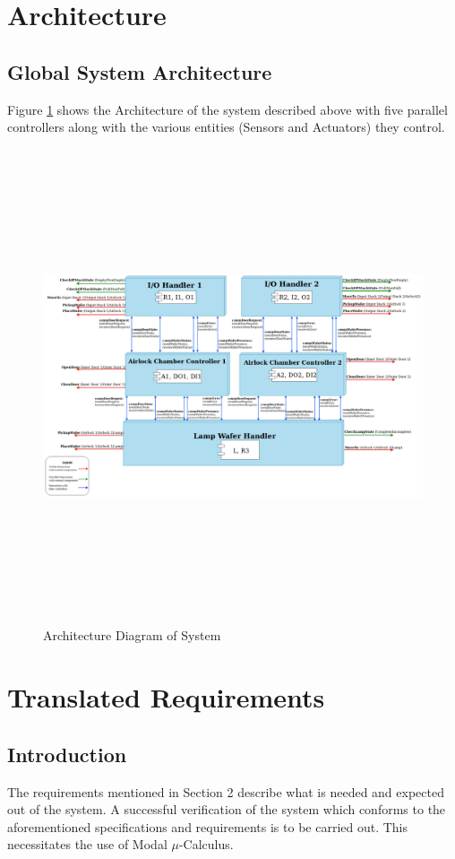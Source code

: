 \documentclass[a4paper,12pt]{article}
\begin{document}
	\section{Architecture}
	\subsection{Global System Architecture}
	Figure \ref{fig:arch1} shows the Architecture of the system described above with five parallel controllers along with the various entities (Sensors and Actuators) they control.\\
	
	\begin{figure}[ht]
		\centerline{
			\includegraphics[width=20cm, height=14cm]{Architecture(last).jpg}}
		\caption{Architecture Diagram of System}
		\label{fig:arch1}
	\end{figure}
	\newpage
	\section{Translated Requirements}
	\subsection{Introduction}
	The requirements mentioned in Section 2 describe what is needed and expected out of the system. A successful verification of the system which conforms to the aforementioned specifications and requirements is to be carried out. This necessitates the use of Modal $\mu$-Calculus.   
\end{document}
